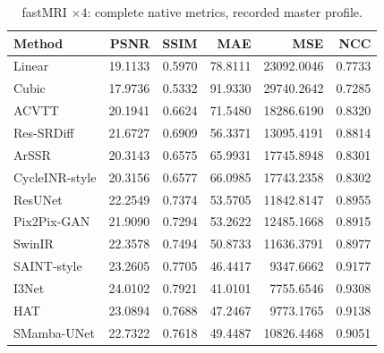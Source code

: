 \begin{table}[t]\centering\small
\caption{fastMRI $\times4$: complete native metrics, recorded master profile.}
\begin{tabular}{lrrrrr}\toprule Method&PSNR&SSIM&MAE&MSE&NCC\\\midrule
Linear & 19.1133 & 0.5970 & 78.8111 & 23092.0046 & 0.7733\\
Cubic & 17.9736 & 0.5332 & 91.9330 & 29740.2642 & 0.7285\\
ACVTT & 20.1941 & 0.6624 & 71.5480 & 18286.6190 & 0.8320\\
Res-SRDiff & 21.6727 & 0.6909 & 56.3371 & 13095.4191 & 0.8814\\
ArSSR & 20.3143 & 0.6575 & 65.9931 & 17745.8948 & 0.8301\\
CycleINR-style & 20.3156 & 0.6577 & 66.0985 & 17743.2358 & 0.8302\\
ResUNet & 22.2549 & 0.7374 & 53.5705 & 11842.8147 & 0.8955\\
Pix2Pix-GAN & 21.9090 & 0.7294 & 53.2622 & 12485.1668 & 0.8915\\
SwinIR & 22.3578 & 0.7494 & 50.8733 & 11636.3791 & 0.8977\\
SAINT-style & 23.2605 & 0.7705 & 46.4417 & 9347.6662 & 0.9177\\
I3Net & 24.0102 & 0.7921 & 41.0101 & 7755.6546 & 0.9308\\
HAT & 23.0894 & 0.7688 & 47.2467 & 9773.1765 & 0.9138\\
SMamba-UNet & 22.7322 & 0.7618 & 49.4487 & 10826.4468 & 0.9051\\
\bottomrule\end{tabular}\end{table}
